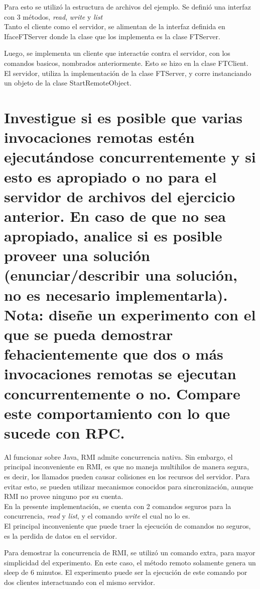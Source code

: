 \documentclass[osajnl,twocolumn,showpacs,superscriptaddress,10pt]{revtex4-1} %
\begin{document}
Para esto se utilizó la estructura de archivos del ejemplo. Se definió
una interfaz con 3 métodos, \textit{read}, \textit{write} y
\textit{list} \\

Tanto el cliente como el servidor, se alimentan de la interfaz definida
en IfaceFTServer donde la clase que los implementa es la clase FTServer.

Luego, se implementa un cliente que interactúe contra el servidor, con
los comandos basicos, nombrados anteriormente. Esto se hizo en la clase
FTClient. El servidor, utiliza la implementación de la clase FTServer, y
corre instanciando un objeto de la clase StartRemoteObject.

\section{Investigue si es posible que varias invocaciones remotas estén ejecutándose
concurrentemente y si esto es apropiado o no para el servidor de archivos del ejercicio
anterior. En caso de que no sea apropiado, analice si es posible proveer una solución
(enunciar/describir una solución, no es necesario implementarla). Nota: diseñe un
experimento con el que se pueda demostrar fehacientemente que dos o más invocaciones
remotas se ejecutan concurrentemente o no. Compare este comportamiento con lo que
sucede con RPC.}

Al funcionar sobre Java, RMI admite concurrencia nativa. Sin embargo,
el principal inconveniente en RMI, es que no maneja multihilos de manera
segura, es decir, los llamados pueden causar colisiones en los recursos
del servidor. 
Para evitar esto, se pueden utilizar mecanismos conocidos para sincronización,
aunque RMI no provee ninguno por su cuenta. \\

En la presente implementación, se cuenta con 2 comandos seguros para la concurrencia,
\textit{read} y \textit{list}, y el comando \textit{write} el cual no lo es. \\

El principal inconveniente que puede traer la ejecución de comandos no seguros, es
la perdida de datos en el servidor.

Para demostrar la concurrencia de RMI, se utilizó un comando extra, para
mayor simplicidad del experimento. En este caso, el método remoto solamente
genera un sleep de 6 minutos. El experimento puede ser la ejecución de este comando por dos clientes
interactuando con el mismo servidor.
\end{document}
